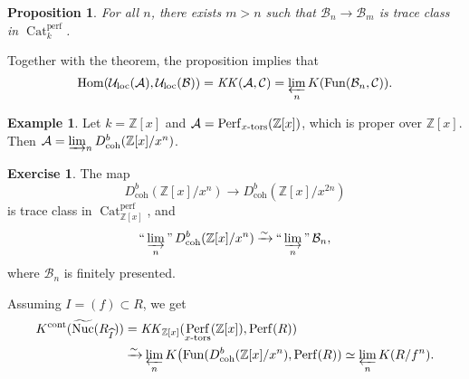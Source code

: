 \documentclass[draft]{amsart}
\newcommand{\ZZ}{\mathbb{Z}}
\newcommand{\wh}[1]{\widehat{#1}}
\newcommand{\wt}[1]{\widetilde{#1}}
\newcommand{\cat}[1]{\mathcal{#1}}
\newcommand{\isoto}{\mathbin{\xrightarrow{\sim}}}
\DeclareMathOperator{\Hom}{Hom}
\DeclareMathOperator{\Nuc}{Nuc}
\DeclareMathOperator{\Cat}{Cat}
\DeclareMathOperator{\Fun}{Fun}
\DeclareMathOperator{\Perf}{Perf}
\DeclareMathOperator*{\indinjlim}{\text{``}\varinjlim\text{''}} %
\newtheorem{prop}[thm]{Proposition}
\theoremstyle{definition}
\newtheorem{ex}[thm]{Example}
\newtheorem{exercise}[thm]{Exercise}
\begin{document}
\begin{prop}
For all $n$, there exists $m>n$ such that $\cat B_n\to \cat B_m$ is trace class in $\Cat^{\mathrm{perf}}_k$.
\end{prop}

Together with the theorem, the proposition implies that
\[
\Hom(\cat U_{\mathrm{loc}}(\cat A), \cat U_{\mathrm{loc}}(\cat B)) = \mathit{KK}(\cat A, \cat C) = \varprojlim_n K(\Fun(\cat B_n, \cat C)).
\]

\begin{ex}
Let $k = \ZZ[x]$ and $\cat A = \Perf_{\textnormal{$x$-tors}}(\ZZ[x])$, which is proper over $\ZZ[x]$. Then $\cat A = \varinjlim_n D^b_{\mathrm{coh}}(\ZZ[x]/x^n)$.
\end{ex}

\begin{exercise}
The map
\[
D^b_{\mathrm{coh}}(\ZZ[x]/x^n) \to D^b_{\mathrm{coh}}(\ZZ[x]/x^{2n})
\]
is trace class in $\Cat^{\mathrm{perf}}_{\ZZ[x]}$, and
\[
\indinjlim_n D^b_{\mathrm{coh}}(\ZZ[x]/x^n) \isoto \indinjlim_n \cat B_n,
\]
where $\cat B_n$ is finitely presented.
\end{exercise}

Assuming $I = (f) \subset R$, we get
\begin{align*}
K^{\mathrm{cont}}(\wt{\Nuc}(R_{\wh I})) &= \mathit{KK}_{\ZZ[x]}(\Perf_{\textnormal{$x$-tors}}(\ZZ[x]), \Perf(R)) \\
&\isoto \varprojlim_n K\bigl(\Fun(D^b_{\mathrm{coh}}(\ZZ[x]/x^n), \Perf(R)) \simeq \varprojlim_n K(R/f^n).
\end{align*}
\end{document}
